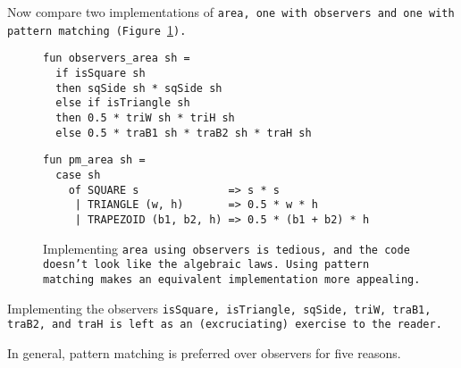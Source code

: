 \documentclass[manuscript,screen,review, 12pt, nonacm]{acmart}
\begin{document}
Now compare two implementations of \tt{area}, one with observers and one with
pattern matching (Figure~\ref{fig:area}).

    \begin{figure}[H]
      \begin{minipage}[t]{0.7\textwidth}
        \begin{verbatim}
fun observers_area sh =
  if isSquare sh
  then sqSide sh * sqSide sh
  else if isTriangle sh 
  then 0.5 * triW sh * triH sh
  else 0.5 * traB1 sh * traB2 sh * traH sh
            \end{verbatim}
            \label{fig:observersarea} 
      \end{minipage}
      \vfill
      \begin{minipage}[t]{0.7\textwidth}
        \begin{verbatim}
fun pm_area sh =
  case sh 
    of SQUARE s              => s * s
     | TRIANGLE (w, h)       => 0.5 * w * h
     | TRAPEZOID (b1, b2, h) => 0.5 * (b1 + b2) * h
                \end{verbatim}
       \vspace{2.2em}
       \label{fig:pmarea}
      \end{minipage}
      \caption{Implementing \tt{area} using observers is tedious, and the code
      doesn't look like the algebraic laws. Using pattern matching makes an
      equivalent implementation more appealing.}
      \label{fig:area}
    \end{figure}

    Implementing the observers \tt{isSquare}, \tt{isTriangle}, \tt{sqSide},
    \tt{triW}, \tt{traB1}, \tt{traB2}, and \tt{traH} is left as an
    (excruciating) exercise to the reader. 

    In general, pattern matching is preferred over observers for five reasons. 
\end{document}
